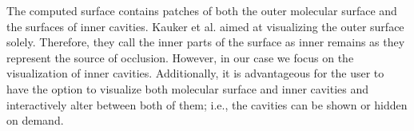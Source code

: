
The computed surface contains patches of both the outer molecular surface and the surfaces of inner cavities.
Kauker et al. \cite{kauker2013rendering} aimed at visualizing the outer surface solely.
Therefore, they call the inner parts of the surface as inner remains as they represent the source of occlusion.
However, in our case we focus on the visualization of inner cavities.
Additionally, it is advantageous for the user to have the option to visualize both molecular surface and inner cavities and interactively alter between both of them; i.e., the cavities can be shown or hidden on demand.

